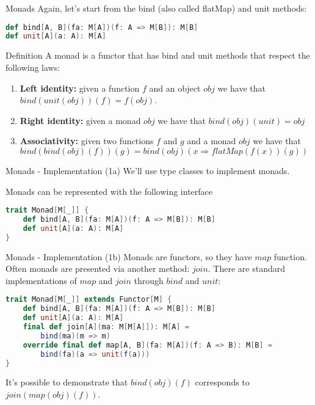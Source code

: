 \begin{frame}[fragile]{Monads}
	Again, let's start from the bind (also called flatMap) and unit methods:
\begin{lstlisting}[language=scala]
def bind[A, B](fa: M[A])(f: A => M[B]): M[B]
def unit[A](a: A): M[A]
\end{lstlisting}
	\pause
	\begin{block}{Definition}
		A monad is a functor that has bind and unit methods that respect the following laws:
		\begin{enumerate}[<+->]
			\item \textbf{Left identity:}  given a function $f$ and an object $obj$ we have that $bind(unit(obj))(f) = f(obj)$.
			\item \textbf{Right identity:} given a monad $obj$ we have that $bind(obj)(unit) = obj$
			\item \textbf{Associativity:} given two functions $f$ and $g$ and a monad $obj$ we have that 
			$bind(bind(obj)(f))(g) = bind(obj)(x \Rightarrow flatMap(f(x))(g))$
		\end{enumerate}
	\end{block}
\end{frame}

\begin{frame}[fragile]{Monads - Implementation (1a)}	
	We'll use type classes to implement monads.
	
	Monads can be represented with the following interface
\begin{lstlisting}[language=scala]
trait Monad[M[_]] {
	def bind[A, B](fa: M[A])(f: A => M[B]): M[B]
	def unit[A](a: A): M[A]
}			
\end{lstlisting}
\end{frame}

\begin{frame}[fragile]{Monads - Implementation (1b)}	
	Monads are functors, so they have $map$ function.
	Often monads are presented via another method: $join$.
	There are standard implementations of $map$ and $join$ through $bind$ and $unit$:
\begin{lstlisting}[language=scala]
trait Monad[M[_]] extends Functor[M] {
	def bind[A, B](fa: M[A])(f: A => M[B]): M[B]
	def unit[A](a: A): M[A]
	final def join[A](ma: M[M[A]]): M[A] = 
		bind(ma)(m => m)
	override final def map[A, B](fa: M[A])(f: A => B): M[B] = 
		bind(fa)(a => unit(f(a)))
}			
\end{lstlisting}
	It's possible to demonstrate that $bind(obj)(f)$ corresponds to $join(map(obj)(f))$.
\end{frame}

